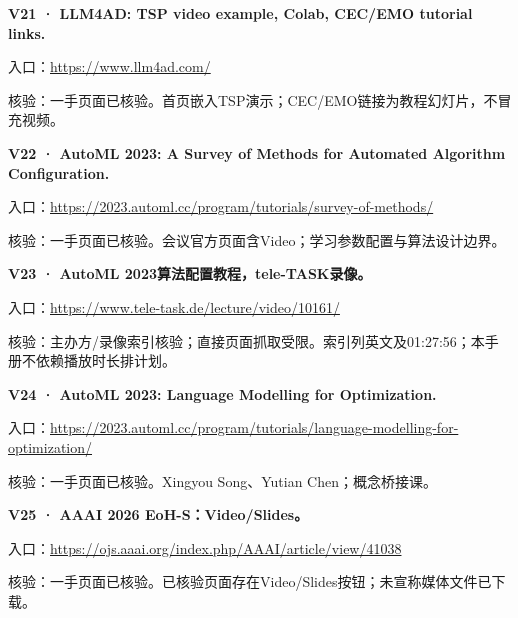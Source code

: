 \par\noindent\begin{minipage}{\linewidth}
\textbf{V21 · LLM4AD: TSP video example, Colab, CEC/EMO tutorial links.}

入口：\url{https://www.llm4ad.com/}

核验：一手页面已核验。首页嵌入TSP演示；CEC/EMO链接为教程幻灯片，不冒充视频。
\end{minipage}\par\vspace{6pt}

\par\noindent\begin{minipage}{\linewidth}
\textbf{V22 · AutoML 2023: A Survey of Methods for Automated Algorithm
Configuration.}

入口：\url{https://2023.automl.cc/program/tutorials/survey-of-methods/}

核验：一手页面已核验。会议官方页面含Video；学习参数配置与算法设计边界。
\end{minipage}\par\vspace{6pt}

\par\noindent\begin{minipage}{\linewidth}
\textbf{V23 · AutoML 2023算法配置教程，tele-TASK录像。}

入口：\url{https://www.tele-task.de/lecture/video/10161/}

核验：主办方/录像索引核验；直接页面抓取受限。索引列英文及01:27:56；本手册不依赖播放时长排计划。
\end{minipage}\par\vspace{6pt}

\par\noindent\begin{minipage}{\linewidth}
\textbf{V24 · AutoML 2023: Language Modelling for Optimization.}

入口：\url{https://2023.automl.cc/program/tutorials/language-modelling-for-optimization/}

核验：一手页面已核验。Xingyou Song、Yutian Chen；概念桥接课。
\end{minipage}\par\vspace{6pt}

\par\noindent\begin{minipage}{\linewidth}
\textbf{V25 · AAAI 2026 EoH-S：Video/Slides。}

入口：\url{https://ojs.aaai.org/index.php/AAAI/article/view/41038}

核验：一手页面已核验。已核验页面存在Video/Slides按钮；未宣称媒体文件已下载。
\end{minipage}\par\vspace{6pt}

